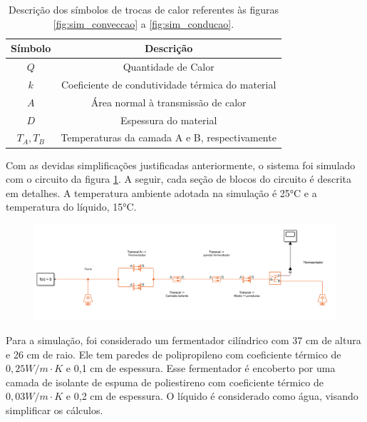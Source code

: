 \begin{table}[H]
    \begin{center}
        \begin{tabular}{ |c|c| } 
            \hline
            Símbolo & Descrição \\
            \hline
            \(Q\) & Quantidade de Calor \\
            \hline
            \(k\) & Coeficiente de condutividade térmica do material \\
            \hline
            \(A\) & Área normal à transmissão de calor \\
            \hline
            \(D\) & Espessura do material \\
            \hline
            \(T_A, T_B\) & Temperaturas da camada A e B, respectivamente \\
            \hline
        \end{tabular}
        \caption{\label{tab:legenda_blocos} Descrição dos símbolos de trocas de calor referentes às figuras \ref{fig:sim_conveccao} a \ref{fig:sim_conducao}.}
    \end{center}
\end{table}


Com as devidas simplificações justificadas anteriormente, o sistema foi simulado com o circuito da figura \ref{fig:sim_circuito}. A seguir, cada seção de blocos do circuito é descrita em detalhes. A temperatura ambiente adotada na simulação é 25°C e a temperatura do líquido, 15°C.

\begin{figure}[H]
    \centering
    \includegraphics[scale=0.39]{figuras/projeto/controle/sim_circuito.png}
    \label{fig:sim_circuito}
\end{figure}


Para a simulação, foi considerado um fermentador cilíndrico com 37 cm de altura e 26 cm de raio. Ele tem paredes de polipropileno com coeficiente térmico de \(0,25 W / m \cdot K\)  e 0,1 cm de espessura. Esse fermentador é encoberto por uma camada de isolante de espuma de poliestireno com coeficiente térmico de  \(0,03 W / m \cdot K\) e 0,2 cm de espessura. O líquido é considerado como água, visando simplificar os cálculos. 



